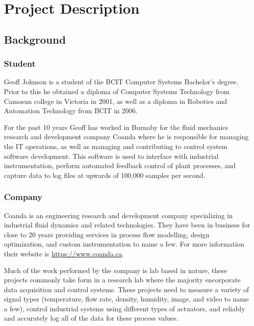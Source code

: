 \section{Project Description}\label{sec:desc}

  \subsection{Background}\label{sec:desc-bg}

    \subsubsection{Student}\label{sec:desc-bg-student}

      Geoff Johnson is a student of the BCIT Computer Systems Bachelor's degree.
      Prior to this he obtained a diploma of Computer Systems Technology from
      Camosun college in Victoria in 2001, as well as a diploma in Robotics and
      Automation Technology from BCIT in 2006.

      For the past 10 years Geoff has worked in Burnaby for the fluid mechanics
      research and development company Coanda where he is responsible for managing
      the IT operations, as well as managing and contributing to control system
      software development. This software is used to interface with industrial
      instrumentation, perform automated feedback control of plant processes,
      and capture data to log files at upwards of 100,000 samples per second.

    \subsubsection{Company}\label{sec:desc-bg-company}

      Coanda is an engineering research and development company specializing in
      industrial fluid dynamics and related technologies. They have been in
      business for close to 20 years providing services in process flow modelling,
      design optimization, and custom instrumentation to name a few. For more
      information their website is \url{https://www.coanda.ca}.

      Much of the work performed by the company is lab based in nature, these
      projects commonly take form in a research lab where the majority
      encorporate data acquisition and control systems. These projects need to
      measure a variety of signal types (temperature, flow rate, density,
      humidity, image, and video to name a few), control industrial systems
      using different types of actuators, and reliably and accurately log all
      of the data for these process values.

